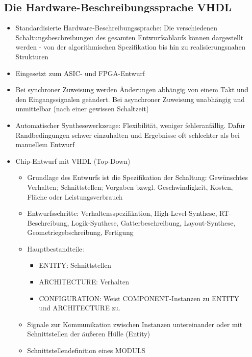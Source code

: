 \subsection{Die Hardware-Beschreibungssprache VHDL}
\begin{itemize}
	\item Standardisierte Hardware-Beschreibungssprache: Die verschiedenen Schaltungsbeschreibungen des gesamten Entwurfsablaufs können dargestellt werden - von der algorithmischen Spezifikation bis hin zu realisierungsnahen Strukturen
	\item Eingesetzt zum ASIC- und FPGA-Entwurf
	\item Bei synchroner Zuweisung werden Änderungen abhängig von einem Takt und den Eingangssignalen geändert. Bei asynchroner Zuweisung unabhängig und unmittelbar (nach einer gewissen Schaltzeit)
	\item Automatischer Synthesewerkzeuge: Flexibilität, weniger fehleranfällig. Dafür Randbedingungen schwer einzuhalten und Ergebnisse oft schlechter als bei manuellem Entwurf
	\item Chip-Entwurf mit VHDL (Top-Down)
	\begin{itemize}
		\item Grundlage des Entwurfs ist die Spezifikation der Schaltung: Gewünschtes Verhalten; Schnittstellen; Vorgaben bzwgl. Geschwindigkeit, Kosten, Fläche oder Leistungsverbrauch
		\item Entwurfsschritte: Verhaltensspezifikation, High-Level-Synthese, RT-Beschreibung, Logik-Synthese, Gatterbeschreibung, Layout-Synthese, Geometriegebschreibung, Fertigung
		\item Hauptbestandteile: 
		\begin{itemize}
			\item ENTITY: Schnittstellen
			\item ARCHITECTURE: Verhalten
			\item CONFIGURATION: Weist COMPONENT-Instanzen zu ENTITY und ARCHITECTURE zu.
		\end{itemize} 
		\item Signale zur Kommunikation zwischen Instanzen untereinander oder mit Schnittstellen der äußeren Hülle (Entity)
		\item Schnittstellendefinition eines MODULS\\\\
			\begin{minipage}{\linewidth}
			\begin{lstlisting}[frame=single,numbers=left,mathescape,language=VHDL,tabsize=4]

\end{lstlisting}
\end{minipage}
\end{itemize}
\end{itemize}
